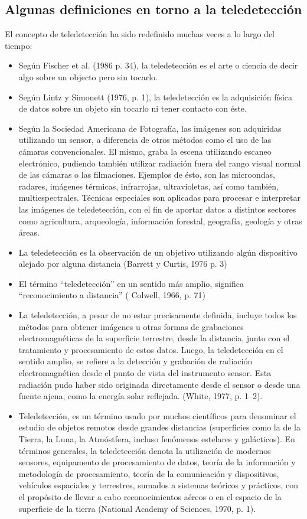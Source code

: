 	\subsection{Algunas definiciones en torno a la teledetecci\'on}
		El concepto de teledetecci\'on ha sido redefinido muchas veces a lo largo del tiempo:
		\begin{itemize}
			\item Seg\'un Fischer et al. (1986 p. 34), la teledetecci\'on es el arte o ciencia de decir algo sobre un objecto pero sin tocarlo.
			\item Seg\'un Lintz y Simonett (1976, p. 1), la teledetecci\'on es la adquisici\'on f\'isica de datos sobre un objeto sin tocarlo ni tener contacto con \'este.
			\item Seg\'un la Sociedad Americana de Fotograf\'ia, las im\'agenes son adquiridas utilizando un sensor, a diferencia de otros m\'etodos como el uso de las c\'amaras convencionales. El mismo, graba la escena utilizando escaneo electr\'onico, pudiendo tambi\'en utilizar radiaci\'on fuera del rango visual normal de las c\'amaras o las filmaciones. Ejemplos de \'esto, son las microondas, radares, im\'agenes t\'ermicas, infrarrojas, ultravioletas, as\'i como tambi\'en, multiespectrales. T\'ecnicas especiales son aplicadas para procesar e interpretar las im\'agenes de teledetecci\'on, con el fin de aportar datos a distintos sectores como agricultura, arqueolog\'ia, informaci\'on forestal, geograf\'ia, geolog\'ia y otras \'areas.
			\item La teledetecci\'on es la observaci\'on de un objetivo utilizando alg\'un dispositivo alejado por alguna distancia (Barrett y Curtis, 1976 p. 3)
			\item El t\'ermino ``teledetecci\'on'' en un sentido m\'as amplio, significa “reconocimiento a distancia” ( Colwell, 1966, p. 71)
			\item La teledetecci\'on, a pesar de no estar precisamente definida, incluye todos los m\'etodos para obtener im\'agenes u otras formas de grabaciones electromagn\'eticas de la superficie terrestre, desde la distancia, junto con el tratamiento y procesamiento de estos datos. Luego, la teledetecci\'on en el sentido amplio,  se refiere a la detecci\'on y grabaci\'on de radiaci\'on electromagn\'etica desde el punto de vista del instrumento sensor. Esta radiaci\'on pudo haber sido originada directamente desde el sensor o desde una fuente ajena, como la energ\'ia solar reflejada. (White, 1977, p. 1–2).
			\item Teledetecci\'on, es un t\'ermino usado por muchos cient\'ificos para denominar el estudio de objetos remotos desde grandes distancias (superficies como la de la Tierra, la Luna, la Atm\'ostfera, incluso fen\'omenos estelares y gal\'acticos). En t\'erminos generales, la teledetecci\'on denota la utilizaci\'on de modernos sensores, equipamento de procesamiento de datos, teor\'ia de la informaci\'on y metodolog\'ia de procesamiento, teor\'ia de la comunicaci\'on y dispositivos, veh\'iculos espaciales y terrestres, sumados a sistemas te\'oricos y pr\'acticos, con el prop\'osito de llevar a cabo reconocimientos a\'ereos o en el espacio de la superficie de la tierra (National Academy of Sciences, 1970, p. 1).

\end{itemize}
